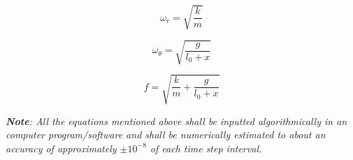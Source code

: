    \begin{equation}
        \omega_r = \sqrt{\frac{k}{m}}
        \label{eq5}
    \end{equation}
            
    \begin{equation}
        \omega_\theta = \sqrt{\frac{g}{l_0 + x}}
        \label{eq6}
    \end{equation}
            
    \begin{equation}
        f = \sqrt{\frac{k}{m} + \frac{g}{l_0 + x}}
        \label{eq7}
    \end{equation}
            
\textit{\textbf{Note}: All the equations mentioned above shall be inputted algorithmically in an computer program/software and shall be numerically estimated to about an accuracy of approximately $\pm10^{-8}$ of each time step interval.}
            
            




